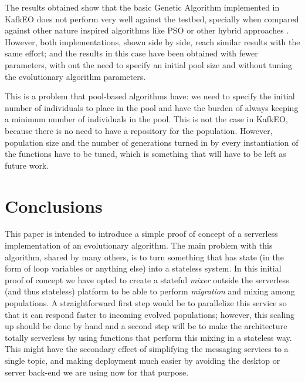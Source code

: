 \documentclass{llncs}
\begin{document}
The results obtained show that the basic Genetic Algorithm implemented
  in KafkEO does not perform
  very well against the testbed, specially when compared against other nature
  inspired algorithms like PSO or other hybrid approaches \cite{hansen2010bbob}.
  However, both implementations, shown side by side, reach similar results with the same
  effort; and the results in this case have been obtained with fewer
  parameters, with out the need to specify an initial pool size and
  without tuning the evolutionary algorithm parameters.

  This is a problem that pool-based algorithms have: we need to
  specify the initial number of individuals to place in the pool and have the
  burden of always keeping a minimum number of individuals in the pool. This
  is not the case in KafkEO, because there is no need to have a
  repository for the population. However, population size and the number
  of generations turned in by every instantiation of the functions have
  to be tuned, which is something that will have to be left as future
  work.


 \section{Conclusions}
 \label{sec:con}

  This paper is intended to introduce a simple proof of concept of a
  serverless implementation of an evolutionary algorithm. The main
  problem with this algorithm, shared by many others, is to turn
  something that has state (in the form of loop variables or anything
  else) into a stateless system. In this initial proof of concept we have
  opted to create a stateful {\em mixer} outside the serverless (and
  thus stateless) platform to be able to perform {\em
    migration} and mixing among populations. A straightforward first step
  would be to parallelize this service so that it can respond faster to
  incoming evolved populations; however, this scaling up should be done
  by hand and a second step will be to make the architecture totally
  serverless by using functions that perform this mixing in a stateless
  way. This might have the secondary effect of simplifying the messaging
  services to a single topic, and making deployment much easier by
  avoiding the desktop or server back-end we are using now for that
  purpose.
\end{document}
